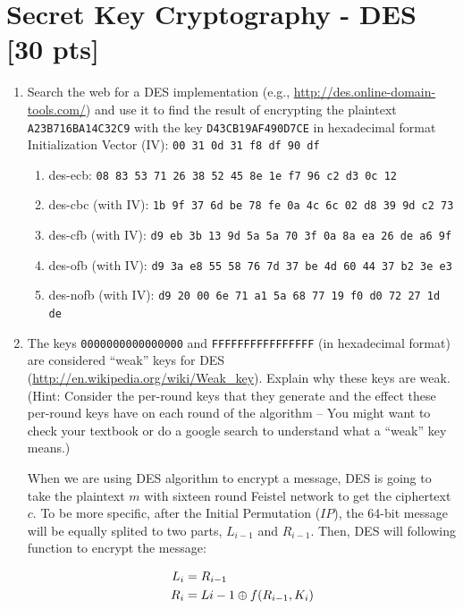 \documentclass[11pt]{article}
\begin{document}
\section{Secret Key Cryptography - DES [30 pts]}
\begin{enumerate}
\item Search the web for a DES implementation (e.g.,  \url{http://des.online-domain-tools.com/}) and use it to find the result of encrypting the plaintext {\tt A23B716BA14C32C9} with the key {\tt D43CB19AF490D7CE} in hexadecimal format \\

Initialization Vector (IV): {\tt 00 31 0d 31 f8 df 90 df}
  \begin{enumerate}
    \item des-ecb: {\tt 08 83 53 71 26 38 52 45 8e 1e f7 96 c2 d3 0c 12}
    \item des-cbc (with IV): {\tt 1b 9f 37 6d be 78 fe 0a 4c 6c 02 d8 39 9d c2 73}
    \item des-cfb (with IV): {\tt d9 eb 3b 13 9d 5a 5a 70 3f 0a 8a ea 26 de a6 9f}
    \item des-ofb (with IV): {\tt d9 3a e8 55 58 76 7d 37 be 4d 60 44 37 b2 3e e3}
    \item des-nofb (with IV): {\tt d9 20 00 6e 71 a1 5a 68 77 19 f0 d0 72 27 1d de}
  \end{enumerate}

\item The keys {\tt 0000000000000000} and {\tt FFFFFFFFFFFFFFFF} (in hexadecimal format) are considered ``weak'' keys for DES (\url{http://en.wikipedia.org/wiki/Weak_key}). Explain why these keys are weak. (Hint: Consider the per-round keys that they generate and the effect these per-round keys have on each round of the algorithm --  You might want to check your textbook or do a google search to understand what a  ``weak'' key means.)

When we are using DES algorithm to encrypt a message, DES is going to take the plaintext $m$ with sixteen round Feistel network to get the ciphertext $c$. To be more specific, after the Initial Permutation ($IP$), the 64-bit message will be equally splited to two parts, $L_{i-1}$ and $R_{i-1}$. Then, DES will following function to encrypt the message:

\begin{align*}
  L_{i}&=R_{i-1} \\
  R_{i}&=L{i-1}\oplus f(R_{i-1}, K_{i})
\end{align*}


\end{enumerate}
\end{document}
